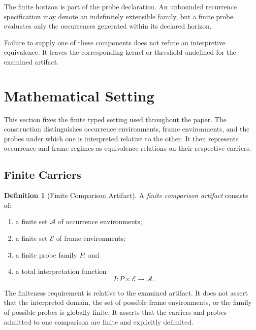 \documentclass[11pt]{article}
\theoremstyle{plain}
\theoremstyle{definition}
\newtheorem{definition}[theorem]{Definition}
\theoremstyle{remark}
\begin{document}
The finite horizon is part of the probe declaration.
An unbounded recurrence specification may denote an indefinitely extensible family,
but a finite probe evaluates only the occurrences generated within its declared horizon.

Failure to supply one of these components does not refute an interpretive equivalence.
It leaves the corresponding kernel or threshold undefined for the examined artifact.


\section{Mathematical Setting}
\label{ik.sec.setting}

This section fixes the finite typed setting used throughout the paper.
The construction distinguishes occurrence environments,
frame environments,
and the probes under which one is interpreted relative to the other.
It then represents occurrence and frame regimes
as equivalence relations on their respective carriers.

\subsection{Finite Carriers}

\begin{definition}[Finite Comparison Artifact]
  \label{ik.def.artifact}
  A \emph{finite comparison artifact} consists of:
  \begin{enumerate}[label=(\alph*)]
    \item a finite set \(\mathcal{A}\) of occurrence environments;
    \item a finite set \(\mathcal{E}\) of frame environments;
    \item a finite probe family \(P\); and
    \item a total interpretation function
          \[
            I:
            P\times\mathcal{E}
            \longrightarrow
            \mathcal{A}.
          \]
  \end{enumerate}
\end{definition}

The finiteness requirement is relative to the examined artifact.
It does not assert that the interpreted domain,
the set of possible frame environments,
or the family of possible probes is globally finite.
It asserts that the carriers and probes admitted to one comparison
are finite and explicitly delimited.
\end{document}
